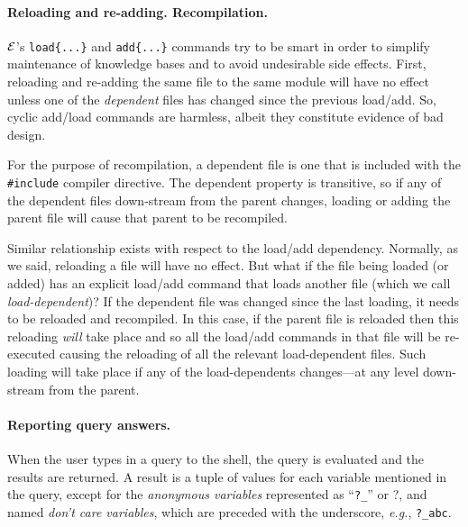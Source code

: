 \documentclass[11pt]{article}
\newcommand{\ERGO}{\mbox{\ensuremath{\cal{E}}\smaller{{\sc{RGO}}}}\xspace}
\newcommand{\FLSYSTEM}{\ERGO}
\newcommand{\anon}{?}
\begin{document}
\paragraph{Reloading and re-adding. Recompilation.}
\FLSYSTEM's \texttt{load\{...\}}  and \texttt{add\{...\}} commands try to be smart in
order to simplify maintenance of knowledge bases and to avoid undesirable
side effects. First, reloading and re-adding the same file to the same
module will have no effect unless one of the \emph{dependent} files has
changed since the previous load/add. So, cyclic add/load commands
are harmless, albeit they constitute evidence of bad design.

For the purpose of recompilation, a dependent file is
one that is included with the \texttt{\#include} compiler directive.
The dependent property is
transitive, so if any of the dependent files down-stream from the parent changes, loading
or adding  the parent file will cause that parent to be recompiled.

Similar relationship exists with respect to the load/add dependency.
Normally, as we said, reloading a file will have no effect. But what if the
file being loaded (or added) has an explicit load/add command that loads
another file (which we call \emph{load-dependent})? If the dependent file
was changed since the last loading, it needs to be reloaded and recompiled. In this case, if the parent file is
reloaded then this reloading \emph{will} take place and so all the
load/add commands in that file will be re-executed causing the reloading
of all the relevant 
load-dependent files. Such loading will
take place if any of the load-dependents changes---at any level down-stream from the
parent.

\paragraph{Reporting query answers.}
When the user types in a query to the shell, the query is evaluated and the
results are returned. A result is a tuple of values for each variable
mentioned in the query, except for the \emph{anonymous variables}
represented as ``{\tt ?\_}'' or \anon, and named {\em don't care
variables}, which are
preceded with the underscore, {\it e.g.}, {\tt ?\_abc}.
\end{document}
